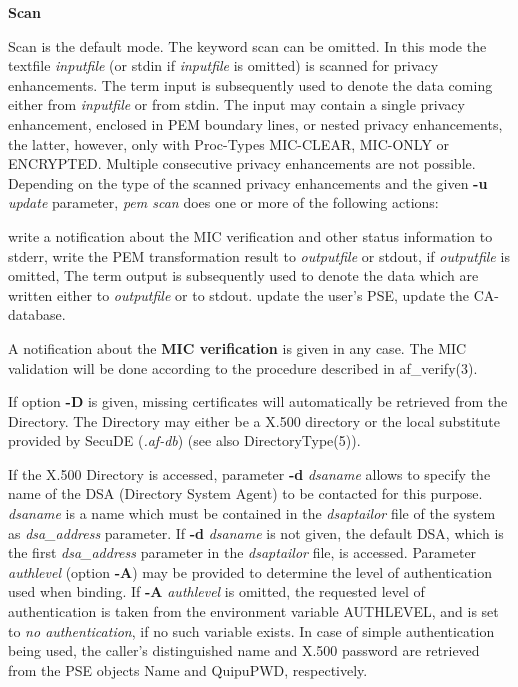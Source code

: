 {\large\bf Scan}

Scan is the default mode. The keyword scan can be omitted. In this mode the textfile {\em inputfile}
(or stdin if {\em inputfile} is omitted) is scanned for privacy enhancements. The term input is
subsequently used to denote the data coming either from {\em inputfile} or from stdin. The input
may contain a single privacy enhancement, enclosed in PEM boundary lines, or nested privacy
enhancements, the latter, however, only with Proc-Types MIC-CLEAR, MIC-ONLY or ENCRYPTED.
Multiple consecutive privacy enhancements are not possible. Depending on the type of the scanned
privacy enhancements and the given {\bf -u} {\em update} parameter, {\em pem scan} does one or
more of the following actions:

\bi
\m write a notification about the MIC verification and other status information to stderr,
\m write the PEM transformation result to {\em outputfile} or stdout, if {\em outputfile} is omitted,
   The term output is subsequently used to denote the data which are written either to
   {\em outputfile} or to stdout.
\m update the user's PSE,
\m update the CA-database.
\ei

A notification about the {\bf MIC verification} is given in any case. The MIC validation will be done
according to the procedure described in af\_verify(3). 

If option {\bf -D} is given, missing certificates will automatically be retrieved from the Directory.
The Directory may either be a X.500 directory or the local substitute provided by 
SecuDE ({\em .af-db}) (see also DirectoryType(5)).

If the X.500 Directory is accessed, parameter {\bf -d} {\em dsaname} allows to specify the 
name of the DSA (Directory System Agent) to be contacted for this purpose. 
{\em dsaname} is a name which must be contained in the 
{\em dsaptailor} file of the system as {\em dsa\_address} parameter. If {\bf -d} {\em dsaname} is
not given, the default DSA, which is the first {\em dsa\_address} parameter in the {\em dsaptailor} 
file, is accessed.
Parameter {\em authlevel} (option {\bf -A}) may be provided to determine the level of authentication used when binding. If {\bf -A} {\em authlevel} is omitted, the requested 
level of authentication is taken from the environment variable AUTHLEVEL, and is set to {\em no 
authentication}, if no such variable exists.
In case of simple authentication being used, the caller's distinguished name and
X.500 password are retrieved from the PSE objects Name and QuipuPWD, respectively.


